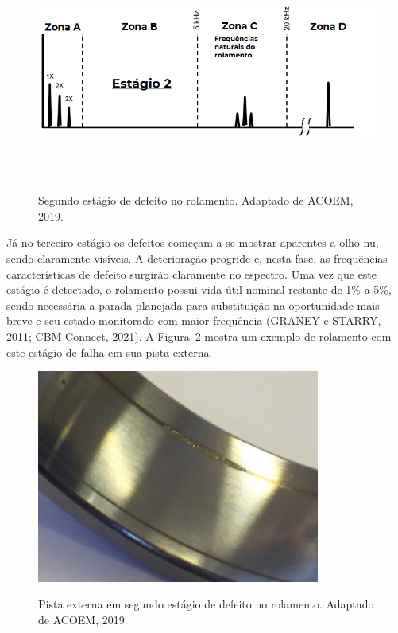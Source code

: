 \documentclass[
	12pt,				
	oneside,			
	a4paper,			
	english,			
	brazil,			
	]{abntex2ppgsi}
\begin{document}
\begin{figure}[H]
\centering
\caption {Segundo estágio de defeito no rolamento. Adaptado de ACOEM, 2019.}
\includegraphics[width=\textwidth,height=70mm,keepaspectratio]{estagio_2}
\label{estagio_2}
\end{figure}

Já no terceiro estágio os defeitos começam a se mostrar aparentes a olho nu, sendo claramente visíveis. A deterioração progride e, nesta fase, as frequências características de defeito surgirão claramente no espectro. Uma vez que este estágio é detectado, o rolamento possui vida útil nominal restante de 1\% a 5\%, sendo necessária a parada planejada para substituição na oportunidade mais breve e seu estado monitorado com maior frequência (GRANEY e STARRY, 2011; CBM Connect, 2021). A Figura~\ref{estagio_tres_pista_externa} mostra um exemplo de rolamento com este estágio de falha em sua pista externa.

\begin{figure}[H]
\centering
\caption {Pista externa em segundo estágio de defeito no rolamento. Adaptado de ACOEM, 2019.}
\includegraphics[width=\textwidth,height=70mm,keepaspectratio]{estagio_tres_pista_externa}
\label{estagio_tres_pista_externa}
\end{figure}
\end{document}
